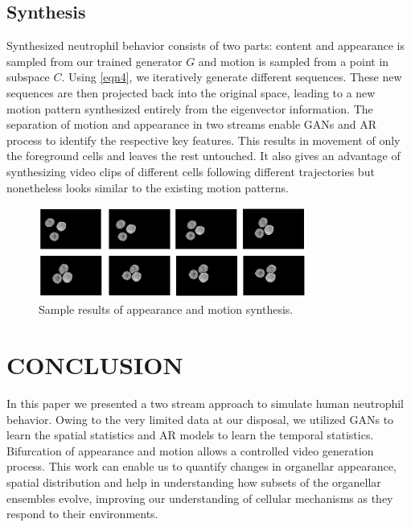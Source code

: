 \documentclass{article}
\newcommand{\squeezeup}{\vspace{-2.5mm}}
\begin{document}
\subsection{Synthesis}
\label{ssec:submethod3}
\squeezeup
Synthesized neutrophil behavior consists of two parts: content and appearance is sampled from our trained generator $G$ and motion is sampled from a point in subspace $C$. Using \ref{eqn4}, we iteratively generate different sequences. These new sequences are then projected back into the original space, leading to a new motion pattern synthesized entirely from the eigenvector information. The separation of motion and appearance in two streams enable GANs and AR process to identify the respective key features. This results in movement of only the foreground cells and leaves the rest untouched. It also gives an advantage of synthesizing video clips of different cells following different trajectories but nonetheless looks similar to the existing motion patterns. \par
\squeezeup
\vspace{-0.20cm}
\begin{figure}[htb]
\begin{minipage}[b]{1.0\linewidth}
  \centering
  \centerline{\includegraphics[width=8.8cm]{synthgrid}}
  \vspace{-0.3cm}
\end{minipage}
\caption{Sample results of appearance and motion synthesis.}
\vspace{-0.4cm}
\end{figure}
\squeezeup
\squeezeup
\vspace{-3.5mm}
\section{CONCLUSION}
\label{sec:conclusion}
\squeezeup
\vspace{-2.0mm}
In this paper we presented a two stream approach to simulate human neutrophil behavior. Owing to the very limited data at our disposal, we utilized GANs to learn the spatial statistics and AR models to learn the temporal statistics. Bifurcation of appearance and motion allows a controlled video generation process. This work can enable us to quantify changes in organellar appearance, spatial distribution and help in understanding how subsets of the organellar ensembles evolve, improving our understanding of cellular mechanisms as they respond to their environments. 
\squeezeup
\vspace{-4.2mm}
\vspace{-0.1cm}
\end{document}
